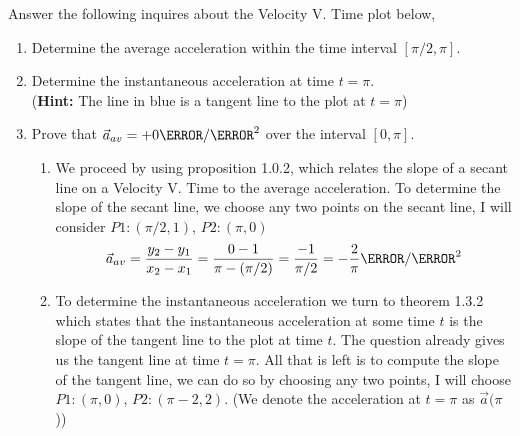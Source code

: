 \documentclass[12pt]{article} %
\begin{document}
\begin{qstn}[4]
    Answer the following inquires about the Velocity V. Time plot below,
    \begin{center}
    \end{center}

    \begin{enumerate}[label = (\alph*)]
        \item Determine the average acceleration within the time interval $[\pi / 2,\pi]$.
        \item Determine the instantaneous acceleration at time $t = \pi$.\\
        (\textbf{Hint:} The line in blue is a tangent line to the plot at $t = \pi$)
        \item Prove that $\vec a_{av} = +0\m / \s^2$ over the interval $[0,\pi]$.

        \begin{soln}
            \begin{enumerate}[label = (\alph*)]
            \item We proceed by using proposition 1.0.2, which relates the slope of a secant line on a Velocity V. Time to the average acceleration. To determine the slope of the secant line, we choose any two points on the secant line, I will consider $P1 \colon (\pi / 2, 1)$, $P2 \colon (\pi, 0)$
            $$\vec a_{av} = \frac{y_2 - y_1}{x_2 - x_1} = \frac{0 - 1}{\pi - (\pi/ 2)} = \frac{-1}{ \pi / 2} = -\frac{2}{\pi} \m / \s^2$$
            \item To determine the instantaneous acceleration we turn to theorem 1.3.2 which states that the instantaneous acceleration at some time $t$ is the slope of the tangent line to the plot at time $t$. The question already gives us the tangent line at time $t = \pi$. All that is left is to compute the slope of the tangent line, we can do so by choosing any two points, I will choose $P1 \colon (\pi,0)$, $P2 \colon (\pi - 2, 2)$. (We denote the acceleration at $t = \pi$ as $\vec a(\pi$))


\end{enumerate}
\end{soln}
\end{enumerate}
\end{qstn}
\end{document}
